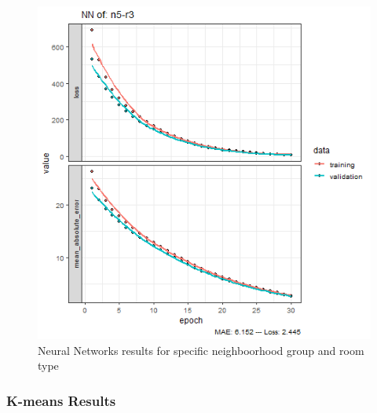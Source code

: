 \documentclass{FR16}
\begin{document}
\begin{figure}[!htb]
\begin{minipage}{0.33\textwidth}
   \end{minipage}
   \begin{minipage}{0.33\textwidth}
     \centering
     \includegraphics[width=1\linewidth]{figures/NN-n5-r3.png} 
   \end{minipage}\hfill
           \caption{Neural Networks results for specific neighboorhood group and room type}\label{fig:21}

\end{figure}





\newpage
\noindent \subsubsection{K-means Results}
\end{document}
